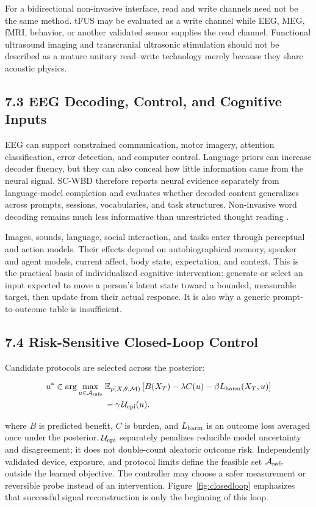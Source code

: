 For a bidirectional non-invasive interface, read and write channels need not
be the same method. tFUS may be evaluated as a write channel while EEG, MEG,
fMRI, behavior, or another validated sensor supplies the read channel.
Functional ultrasound imaging and transcranial ultrasonic stimulation should
not be described as a mature unitary read--write technology merely because
they share acoustic physics.

\subsection{7.3 EEG Decoding, Control, and Cognitive Inputs}

EEG can support constrained communication, motor imagery, attention
classification, error detection, and computer control. Language priors can
increase decoder fluency, but they can also conceal how little information
came from the neural signal. SC-WBD therefore reports neural evidence
separately from language-model completion and evaluates whether decoded
content generalizes across prompts, sessions, vocabularies, and task
structures. Non-invasive word decoding remains much less informative than
unrestricted thought reading \citep{dascoli2025}.

Images, sounds, language, social interaction, and tasks enter through
perceptual and action models. Their effects depend on autobiographical memory,
speaker and agent models, current affect, body state, expectation, and
context. This is the practical basis of individualized cognitive
intervention: generate or select an input expected to move a person's latent
state toward a bounded, measurable target, then update from their actual
response. It is also why a generic prompt-to-outcome table is insufficient.

\subsection{7.4 Risk-Sensitive Closed-Loop Control}

Candidate protocols are selected across the posterior:

\[
\begin{aligned}
u^*\in\arg\max_{u\in\mathcal A_{\rm safe}}\;&
\mathbb{E}_{p(X,\theta,\mathcal{M})}
\left[B(X_T)-\lambda C(u)-\beta L_{\rm harm}(X_T,u)\right]\\
&-\gamma\,\mathcal{U}_{\rm epi}(u).
\end{aligned}
\]

where \(B\) is predicted benefit, \(C\) is burden, and
\(L_{\rm harm}\) is an outcome loss averaged once under the posterior.
\(\mathcal{U}_{\rm epi}\) separately penalizes reducible model uncertainty and
disagreement; it does not double-count aleatoric outcome risk. Independently
validated device, exposure, and protocol limits define the feasible set
\(\mathcal A_{\rm safe}\) outside the learned objective. The controller may
choose a safer measurement or reversible probe instead of an intervention.
Figure~\ref{fig:closedloop} emphasizes that successful signal reconstruction
is only the beginning of this loop.

